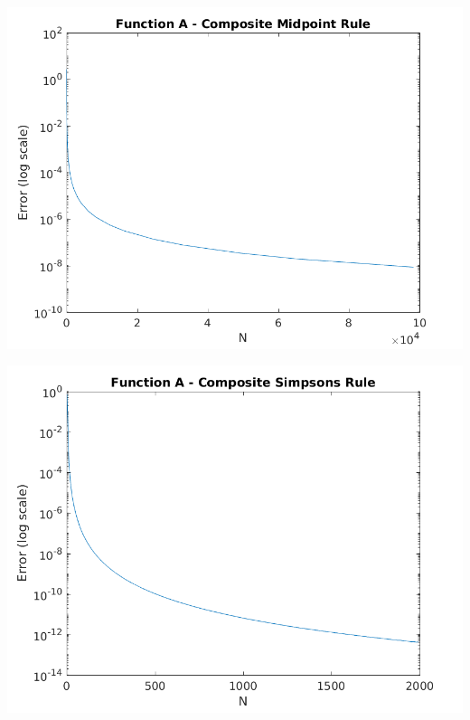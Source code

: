 \documentclass[a4paper]{article}
\begin{document}
\begin{center}
	\includegraphics[width=1\textwidth]{../output/a_midpoint.png}
	\label{fig:a_mid}
\end{center}


\begin{center}
	\includegraphics[width=1\textwidth]{../output/a_simpsons.png}
	\label{fig:a_sim}
\end{center}
\end{document}
